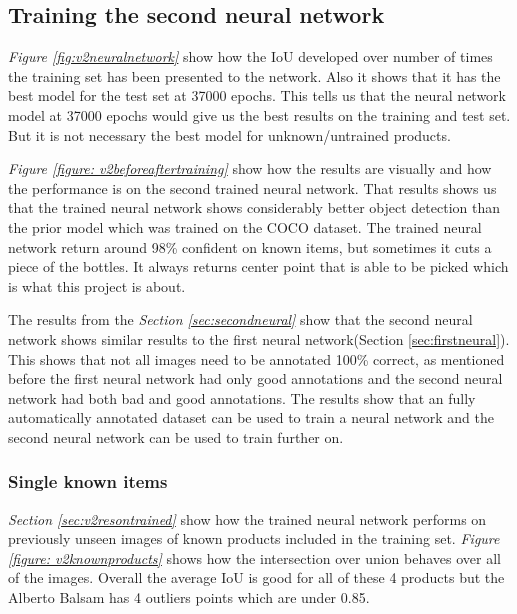 \subsection{Training the second neural network}
\textit{Figure \ref{fig:v2neuralnetwork}} show how the IoU developed over number of times the training set has been presented to the network. Also it shows that it has the best model for the test set at 37000 epochs. This tells us that the neural network model at 37000 epochs would give us the best results on the training and test set. But it is not necessary the best model for unknown/untrained products.

\textit{Figure \ref{figure: v2beforeaftertraining}} show how the results are visually and how the performance is on the second trained neural network. That results shows us that the trained neural network shows considerably better object detection than the prior model which was trained on the COCO dataset. The trained neural network return around 98\% confident on known items, but sometimes it cuts a piece of the bottles. It always returns center point that is able to be picked which is what this project is about. 

The results from the \textit{Section \ref{sec:secondneural}} show that the second neural network shows similar results to the first neural network({Section \ref{sec:firstneural}}). This shows that not all images need to be annotated 100\% correct, as mentioned before the first neural network had only good annotations and the second neural network had both bad and good annotations. The results show that an fully automatically annotated dataset can be used to train a neural network and the second neural network can be used to train further on.


\subsubsection{Single known items}
\textit{Section \ref{sec:v2resontrained}} show how the trained neural network performs on previously unseen images of known products included in the training set. \textit{Figure \ref{figure: v2knownproducts}} shows how the intersection over union behaves over all of the images. Overall the average IoU is good for all of these 4 products but the Alberto Balsam has 4 outliers points which are under 0.85.%


